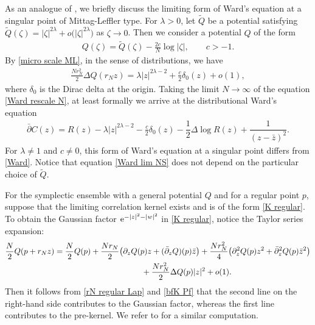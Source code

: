 \documentclass[pdftex]{sigma}
\numberwithin{equation}{section}
\newcommand{\1}{\chi}
\def\bp{{\bar\partial}}
\begin{document}
\begin{Remark}
As an analogue of \cite{ameur2018random}, we briefly discuss the limiting form of Ward's equation at a singular point of Mittag-Leffler type.
For $\lambda>0$, let $\widetilde{Q}$ be a potential satisfying $\widetilde{Q}(\zeta)=|\zeta|^{2\lambda}+o\big(|\zeta|^{2\lambda}\big)$ as $\zeta \to 0$. Then we consider a potential $Q$ of the form
\begin{gather*}
	Q(\zeta)=\widetilde{Q}(\zeta)-\frac{2c}{N}\log |\zeta|, \qquad c>-1.
\end{gather*}
By \eqref{micro scale ML}, in the sense of distributions, we have
\begin{gather*}
\frac{Nr_N^2}{2} \Delta Q( r_N z )=\lambda |z|^{2\lambda-2}+\frac{c}{2} \delta_0(z)+ o(1),
\end{gather*}
where $\delta_0$ is the Dirac delta at the origin. Taking the limit $N \to \infty$ of the equation \eqref{Ward rescale N}, at least formally we arrive at the distributional Ward's equation
\begin{gather} \label{Ward lim NS}
	\bar{\partial} C(z)=R(z)-\lambda |z|^{2\lambda-2}-\frac{c}{2} \delta_0(z)-\dfrac12 \Delta \log R(z)+\dfrac{1}{(z-\bar{z})^2}.
\end{gather}
For $\lambda \not= 1$ and $c \not = 0$, this form of Ward's equation at a singular point differs from \eqref{Ward}.
Notice that equation \eqref{Ward lim NS} does not depend on the particular choice of $\widetilde{Q}.$
\end{Remark}

For the symplectic ensemble with a general potential $Q$ and for a regular point $p$, suppose that the limiting correlation kernel exists and is of the form \eqref{K regular}.
To obtain the Gaussian factor ${\rm e}^{-|z|^2-|w|^2}$ in \eqref{K regular}, notice the Taylor series expansion:
\begin{gather*}
\frac{N}{2} Q(p+r_Nz) = \frac{N}{2} Q(p)+ \frac{Nr_N}{2} \big( \partial_z Q(p) z +( \bp_z Q )(p) \bar{z} \big)+ \frac{N r_N^2}{4} \big( \partial_z^2 Q (p)z^2 + \bp_z^2 Q (p) \bar{z}^2 \big)
 \\
\hphantom{\frac{N}{2} Q(p+r_Nz) =}{}
 +\frac{N r_N^2}{2} \Delta Q(p) |z|^2+o(1).
\end{gather*}
Then it follows from \eqref{rN regular Lap} and \eqref{bfK Pf} that the second line on the right-hand side contributes to the Gaussian factor, whereas the first line contributes to the pre-kernel.
We refer to \cite[Section~3.5]{MR3975882} for a similar computation.
\end{document}
